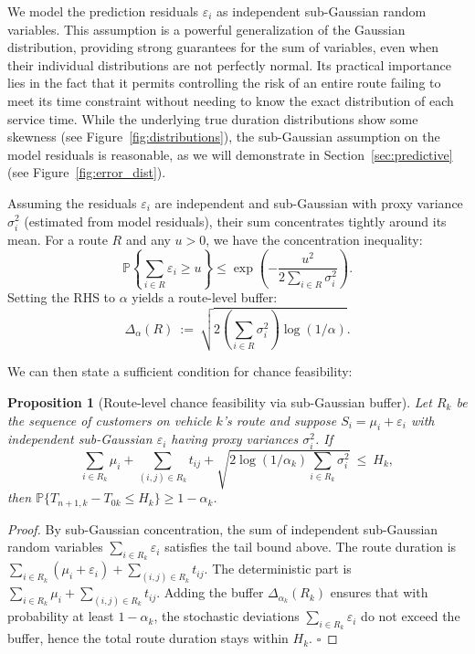 \documentclass[preprint,12pt]{elsarticle}
\newtheorem{proposition}{Proposition}[section]
\begin{document}
We model the prediction residuals $\varepsilon_i$ as independent sub-Gaussian random variables. This assumption is a powerful generalization of the Gaussian distribution, providing strong guarantees for the sum of variables, even when their individual distributions are not perfectly normal. Its practical importance lies in the fact that it permits controlling the risk of an entire route failing to meet its time constraint without needing to know the exact distribution of each service time. While the underlying true duration distributions show some skewness (see Figure~\ref{fig:distributions}), the sub-Gaussian assumption on the model residuals is reasonable, as we will demonstrate in Section~\ref{sec:predictive} (see Figure~\ref{fig:error_dist}).

Assuming the residuals $\varepsilon_i$ are independent and sub-Gaussian with proxy variance $\sigma_i^2$ (estimated from model residuals), their sum concentrates tightly around its mean. For a route $R$ and any $u>0$, we have the concentration inequality:
\begin{equation}
\mathbb{P}\!\left\{\sum_{i\in R}\varepsilon_i \ge u\right\} \le \exp\!\left(-\frac{u^2}{2\sum_{i\in R}\sigma_i^2}\right).
\end{equation}
Setting the RHS to $\alpha$ yields a route-level buffer:
\begin{equation}\label{eq:sg-buffer}
\Delta_\alpha(R)\ :=\ \sqrt{2\left(\sum_{i\in R}\sigma_i^2\right)\log(1/\alpha)}.
\end{equation}

We can then state a sufficient condition for chance feasibility:

\begin{proposition}[Route-level chance feasibility via sub-Gaussian buffer]
\label{prop3.1}
Let $R_k$ be the sequence of customers on vehicle $k$'s route and suppose $S_i=\mu_i+\varepsilon_i$ with independent sub-Gaussian $\varepsilon_i$ having proxy variances $\sigma_i^2$. If
\[
\sum_{i\in R_k}\mu_i + \sum_{(i,j)\in R_k} t_{ij}
+ \sqrt{2\log(1/\alpha_k)\sum_{i\in R_k}\sigma_i^2}
\ \le\ H_k,
\]
then $\mathbb{P}\{T_{n+1,k}-T_{0k} \le H_k\}\ge 1-\alpha_k$.
\end{proposition}

\begin{proof}
    By sub-Gaussian concentration, the sum of independent sub-Gaussian random variables $\sum_{i\in R_k}\varepsilon_i$ satisfies the tail bound above. The route duration is $\sum_{i\in R_k}(\mu_i+\varepsilon_i) + \sum_{(i,j)\in R_k} t_{ij}$. The deterministic part is $\sum_{i\in R_k}\mu_i + \sum_{(i,j)\in R_k} t_{ij}$. Adding the buffer $\Delta_{\alpha_k}(R_k)$ ensures that with probability at least $1-\alpha_k$, the stochastic deviations $\sum_{i\in R_k}\varepsilon_i$ do not exceed the buffer, hence the total route duration stays within $H_k$. \hfill$\square$
\end{proof}
\end{document}
